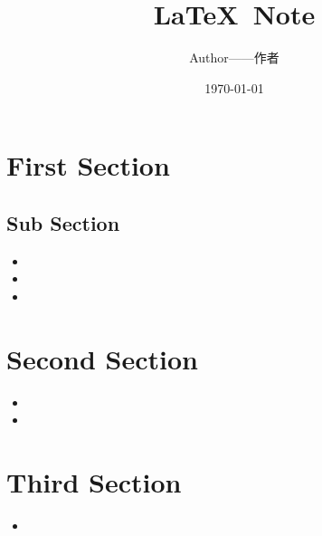 \documentclass[10.5pt]{article}
\title{\LaTeX~Note}
\author{Author——作者}
\date{\today}
\begin{document}
	
	\maketitle
	\lipsum[1-3]
	
	
	\clearpage
	
	\tableofcontents
	
	\clearpage
	
	\section{First Section}
	\label{sec:first}
	\zhlipsum[1]
	\zhlipsum[1]
	\subsection{Sub Section}
	\begin{itemize}
		\item \lipsum[1]
		\item \lipsum[1]
		\item \lipsum[1]
	\end{itemize}
	
	\section{Second Section}
	\label{sec:second}
	
	\begin{itemize}
		\item \lipsum[1]
		\item \lipsum[1]
	\end{itemize}
	
	\section{Third Section}
	\label{sec:third}
	
	\begin{itemize}
		\item \lipsum[1]
	\end{itemize}
	
	
	\clearpage
	
	
	
	
\end{document}
